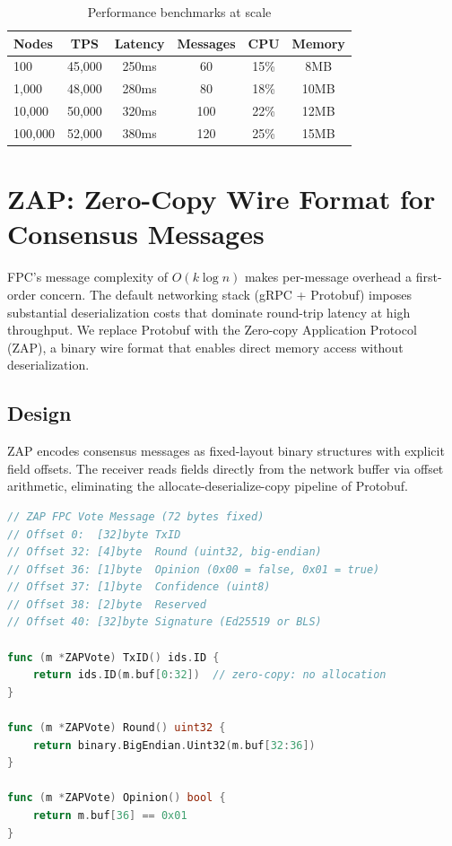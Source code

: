 \documentclass[11pt,a4paper]{article}
\begin{document}
\begin{table}[h]
\centering
\begin{tabular}{lccccc}
\toprule
\textbf{Nodes} & \textbf{TPS} & \textbf{Latency} & \textbf{Messages} & \textbf{CPU} & \textbf{Memory} \\
\midrule
100 & 45,000 & 250ms & 60 & 15\% & 8MB \\
1,000 & 48,000 & 280ms & 80 & 18\% & 10MB \\
10,000 & 50,000 & 320ms & 100 & 22\% & 12MB \\
100,000 & 52,000 & 380ms & 120 & 25\% & 15MB \\
\bottomrule
\end{tabular}
\caption{Performance benchmarks at scale}
\label{tab:benchmarks}
\end{table}

\section{ZAP: Zero-Copy Wire Format for Consensus Messages}
\label{sec:zap}

FPC's message complexity of $O(k \log n)$ makes per-message overhead a first-order concern. The default networking stack (gRPC + Protobuf) imposes substantial deserialization costs that dominate round-trip latency at high throughput. We replace Protobuf with the Zero-copy Application Protocol (ZAP), a binary wire format that enables direct memory access without deserialization.

\subsection{Design}

ZAP encodes consensus messages as fixed-layout binary structures with explicit field offsets. The receiver reads fields directly from the network buffer via offset arithmetic, eliminating the allocate-deserialize-copy pipeline of Protobuf.

\begin{lstlisting}[language=Go, caption=ZAP message layout for FPC vote]
// ZAP FPC Vote Message (72 bytes fixed)
// Offset 0:  [32]byte TxID
// Offset 32: [4]byte  Round (uint32, big-endian)
// Offset 36: [1]byte  Opinion (0x00 = false, 0x01 = true)
// Offset 37: [1]byte  Confidence (uint8)
// Offset 38: [2]byte  Reserved
// Offset 40: [32]byte Signature (Ed25519 or BLS)

func (m *ZAPVote) TxID() ids.ID {
    return ids.ID(m.buf[0:32])  // zero-copy: no allocation
}

func (m *ZAPVote) Round() uint32 {
    return binary.BigEndian.Uint32(m.buf[32:36])
}

func (m *ZAPVote) Opinion() bool {
    return m.buf[36] == 0x01
}
\end{lstlisting}
\end{document}
